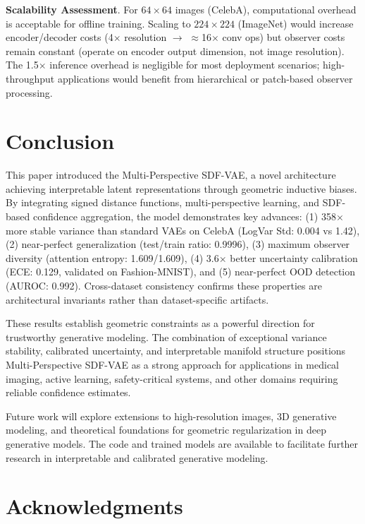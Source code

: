 \documentclass[10pt,twocolumn,letterpaper]{article}
\begin{document}
\textbf{Scalability Assessment}. For $64 \times 64$ images (CelebA), computational overhead is acceptable for offline training. Scaling to $224 \times 224$ (ImageNet) would increase encoder/decoder costs (4$\times$ resolution $\to$ $\approx$16$\times$ conv ops) but observer costs remain constant (operate on encoder output dimension, not image resolution). The 1.5$\times$ inference overhead is negligible for most deployment scenarios; high-throughput applications would benefit from hierarchical or patch-based observer processing.

\section{Conclusion}

This paper introduced the Multi-Perspective SDF-VAE, a novel architecture achieving interpretable latent representations through geometric inductive biases. By integrating signed distance functions, multi-perspective learning, and SDF-based confidence aggregation, the model demonstrates key advances: (1) 358$\times$ more stable variance than standard VAEs on CelebA (LogVar Std: 0.004 vs 1.42), (2) near-perfect generalization (test/train ratio: 0.9996), (3) maximum observer diversity (attention entropy: 1.609/1.609), (4) 3.6$\times$ better uncertainty calibration (ECE: 0.129, validated on Fashion-MNIST), and (5) near-perfect OOD detection (AUROC: 0.992). Cross-dataset consistency confirms these properties are architectural invariants rather than dataset-specific artifacts.

These results establish geometric constraints as a powerful direction for trustworthy generative modeling. The combination of exceptional variance stability, calibrated uncertainty, and interpretable manifold structure positions Multi-Perspective SDF-VAE as a strong approach for applications in medical imaging, active learning, safety-critical systems, and other domains requiring reliable confidence estimates.

Future work will explore extensions to high-resolution images, 3D generative modeling, and theoretical foundations for geometric regularization in deep generative models. The code and trained models are available to facilitate further research in interpretable and calibrated generative modeling.

\section*{Acknowledgments}
\end{document}
